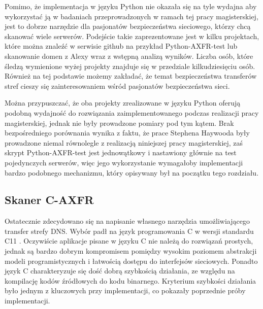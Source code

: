 Pomimo, że implementacja w języku Python nie okazała się na tyle wydajna aby wykorzystać ją w badaniach przeprowadzonych w
ramach tej pracy magisterskiej, jest to dobrze narzędzie dla pasjonatów bezpieczeństwa sieciowego, którzy chcą skanować wiele
serwerów. Podejście takie zaprezentowane jest w kilku projektach, które można znaleźć w serwisie github na przykład
Python-AXFR-test\cite{python_axfr_test} lub skanowanie domen z Alexy wraz z wstępną analizą wyników\cite{asg-axfr}. Liczba osób,
które śledzą wymienione wyżej projekty znajduje się w przedziale kilkudziesięciu osób. Również na tej podstawie możemy zakładać,
że temat bezpieczeństwa transferów stref cieszy się zainteresowaniem wśród pasjonatów bezpieczeństwa sieci.

Można przypuszczać, że oba projekty zrealizowane w języku Python \cite{python_axfr_test, asg-axfr} oferują podobną wydajność do
rozwiązania zaimplementowanego podczas realizacji pracy magisterskiej, jednak nie były prowadzone pomiary pod tym kątem. Brak
bezpośredniego porównania wynika z faktu, że prace Stephena Haywooda\cite{asg-axfr} były prowadzone niemal równolegle z realizacją
niniejszej pracy magisterskiej, zaś skrypt Python-AXFR-test\cite{python_axfr_test} jest jednowątkowy i nastawiony głównie na test
pojedynczych serwerów, więc jego wykorzystanie wymagałoby implementacji bardzo podobnego mechanizmu, który opisywany był na
początku tego rozdziału.

\subsection{Skaner C-AXFR}
Ostatecznie zdecydowano się na napisanie własnego narzędzia umożliwiającego transfer strefy DNS. Wybór padł na język
programowania C \cite{Kernighan:1988:CPL:576122} w wersji standardu C11 \cite{ISO9899}. Oczywiście aplikacje pisane w języku
C nie należą do rozwiązań prostych, jednak są bardzo dobrym kompromisem pomiędzy wysokim poziomem abstrakcji modeli programistycznych
i łatwością dostępu do interfejsów sieciowych. Ponadto język C charakteryzuje się dość dobrą szybkością działania, ze względu na
kompilację kodów źródłowych do kodu binarnego. Kryterium szybkości działania było jednym z kluczowych przy implementacji, co
pokazały poprzednie próby implementacji.

